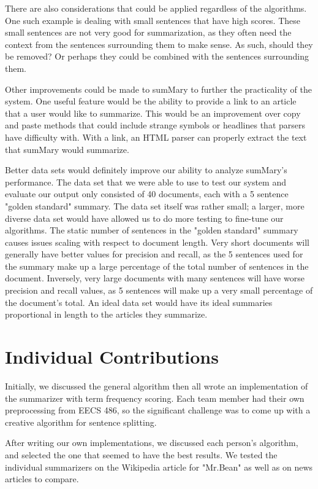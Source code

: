 \documentclass[11pt,a4paper]{article}
\begin{document}
  There are also considerations that could be applied regardless of the algorithms. One such example is dealing with small sentences that have high scores. These small sentences are not very good for summarization, as they often need the context from the sentences surrounding them to make sense. As such, should they be removed? Or perhaps they could be combined with the sentences surrounding them.

  Other improvements could be made to sumMary to further the practicality of the system. One useful feature would be the ability to provide a link to an article that a user would like to summarize. This would be an improvement over copy and paste methods that could include strange symbols or headlines that parsers have difficulty with. With a link, an HTML parser can properly extract the text that sumMary would summarize.

  Better data sets would definitely improve our ability to analyze sumMary's performance. The data set that we were able to use to test our system and evaluate our output only consisted of 40 documents, each with a 5 sentence "golden standard" summary. The data set itself was rather small; a larger, more diverse data set would have allowed us to do more testing to fine-tune our algorithms. The static number of sentences in the "golden standard" summary causes issues scaling with respect to document length. Very short documents will generally have better values for precision and recall, as the 5 sentences used for the summary make up a large percentage of the total number of sentences in the document. Inversely, very large documents with many sentences will have worse precision and recall values, as 5 sentences will make up a very small percentage of the document's total. An ideal data set would have its ideal summaries proportional in length to the articles they summarize.

  \section{Individual Contributions}
  Initially, we discussed the general algorithm then all wrote an implementation of the summarizer with term frequency scoring. Each team member had their own preprocessing from EECS 486, so the significant challenge was to come up with a creative algorithm for sentence splitting.

  After writing our own implementations, we discussed each person's algorithm, and selected the one that seemed to have the best results. We tested the individual summarizers on the Wikipedia article for "Mr.Bean" as well as on news articles to compare.
\end{document}
